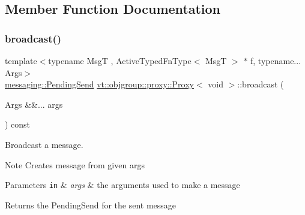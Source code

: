 \subsection{Member Function Documentation}
\mbox{\label{structvt_1_1objgroup_1_1proxy_1_1_proxy_3_01void_01_4_a13f8d6751a246a449e7d13ae7eed3541}} 
\subsubsection{\texorpdfstring{broadcast()}{broadcast()}}
{\footnotesize\ttfamily template$<$typename MsgT , Active\+Typed\+Fn\+Type$<$ Msg\+T $>$ $\ast$ f, typename... Args$>$ \\
\hyperlink{structvt_1_1messaging_1_1_pending_send}{messaging\+::\+Pending\+Send} \hyperlink{structvt_1_1objgroup_1_1proxy_1_1_proxy}{vt\+::objgroup\+::proxy\+::\+Proxy}$<$ void $>$\+::broadcast (\begin{DoxyParamCaption}\item[{Args \&\&...}]{args }\end{DoxyParamCaption}) const}



Broadcast a message. 

\begin{DoxyNote}{Note}
Creates message from given args
\end{DoxyNote}

\begin{DoxyParams}[1]{Parameters}
\mbox{\tt in}  & {\em args} & the arguments used to make a message\\
\hline
\end{DoxyParams}
\begin{DoxyReturn}{Returns}
the {\ttfamily Pending\+Send} for the sent message 
\end{DoxyReturn}
\mbox{\label{structvt_1_1objgroup_1_1proxy_1_1_proxy_3_01void_01_4_ae600f4143bb8102bc15264adc713dfea}} 
